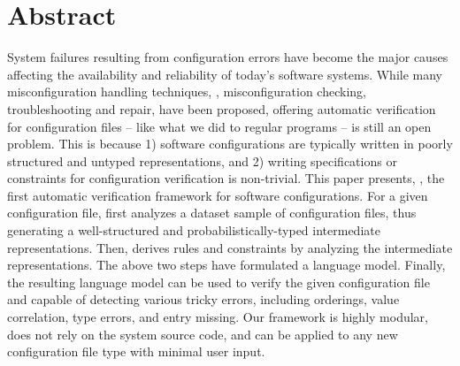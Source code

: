 
\section*{Abstract}

System failures resulting from configuration errors 
have become the major causes affecting the availability and
reliability of today's software systems.
While many misconfiguration handling techniques,
\eg, misconfiguration checking, troubleshooting and repair, 
have been proposed, 
offering automatic verification for configuration files -- like
what we did to regular programs -- is still an open problem.
This is because 1) software configurations are typically written in
poorly structured and untyped representations, and 2) 
writing specifications or constraints for configuration 
verification is non-trivial.
This paper presents, \app, the first automatic verification framework for
software configurations.
For a given configuration file,
\app first analyzes a dataset sample of configuration files,
thus generating a well-structured and probabilistically-typed 
intermediate representations.
Then, \app derives rules and constraints by analyzing
the intermediate representations.
The above two steps have formulated a language model.
Finally, the resulting language model can be used
to verify the given configuration file and capable of 
detecting various tricky errors,
including orderings, value correlation, type errors, and entry missing.
Our \app framework is highly modular, 
does not rely on the system source code, and
can be applied to any new configuration file type with minimal user input.  
